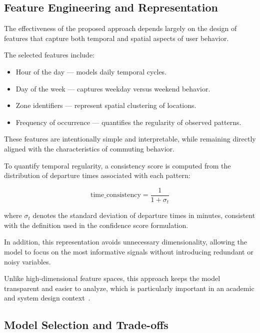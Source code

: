 \subsection{Feature Engineering and Representation}

The effectiveness of the proposed approach depends largely on the design of features that capture both temporal and spatial aspects of user behavior.

The selected features include:

\begin{itemize}
    \item Hour of the day — models daily temporal cycles.
    \item Day of the week — captures weekday versus weekend behavior.
    \item Zone identifiers — represent spatial clustering of locations.
    \item Frequency of occurrence — quantifies the regularity of observed patterns.
\end{itemize}

These features are intentionally simple and interpretable, while remaining directly aligned with the characteristics of commuting behavior.

To quantify temporal regularity, a consistency score is computed from the distribution of departure times associated with each pattern:

\begin{equation}
\text{time\_consistency} =
\frac{1}{1+\sigma_t}
\end{equation}

where $\sigma_t$ denotes the standard deviation of departure times in minutes, consistent with the definition used in the confidence score formulation.

In addition, this representation avoids unnecessary dimensionality, allowing the model to focus on the most informative signals without introducing redundant or noisy variables.

Unlike high-dimensional feature spaces, this approach keeps the model transparent and easier to analyze, which is particularly important in an academic and system design context~\cite{mitchell1997machine}.

\subsection{Model Selection and Trade-offs}

